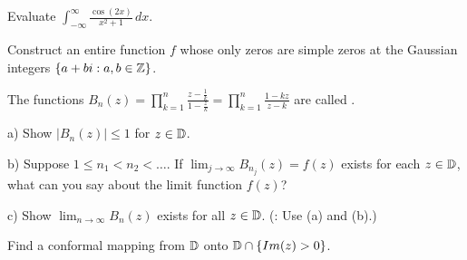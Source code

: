 \documentclass[bbb]{report}
\def\ds{\displaystyle}
\begin{document}
\begin{Large}
\begin{description}
\item[5.] Evaluate 
$\ds\int^{\infty}_{-\infty}
\ds\frac{\cos(2x)}{x^2+1}\,dx.$

\vspace{.35in}

\item[6.] Construct an entire function $f$ whose only zeros
are simple zeros at the Gaussian integers 
$\{a+bi:a,b\in{\Bbb Z}\}$.

\vspace{.35in}


\item[7.] The functions 
$B_n(z)
=\ds\prod^n_{k=1} 
\ds\frac{z-\frac{1}{k}}{1-\frac{z}{k}} 
=\ds\prod^n_{k=1} 
\ds\frac{1-kz}{z-k}$ 
are called .

\vspace{.1in}
\item\item[\quad] a) Show $|B_n(z)|\leq 1$ for 
$z\in{\Bbb D}$.

\vspace{.5in}
\item\item[\quad] b) Suppose $1\leq n_1<n_2<\dots$. 
If $\ds\lim_{j\to\infty} B_{n_j}(z)=f(z)$ exists for each 
$z\in{\Bbb D}$, what can you say about the limit function 
$f(z)$?

\vspace{.5in}
\item\item[\quad] c) Show $\ds\lim_{n\to\infty} B_n(z)$ 
exists for all $z\in{\Bbb D}$. 
(: Use (a) and (b).)


\vspace{.35in}

\item[8.] Find a conformal mapping from ${\Bbb D}$ onto 
${\Bbb D}\cap\{Im(z)>0\}$.

\end{description}
\end{Large}
\end{document}
